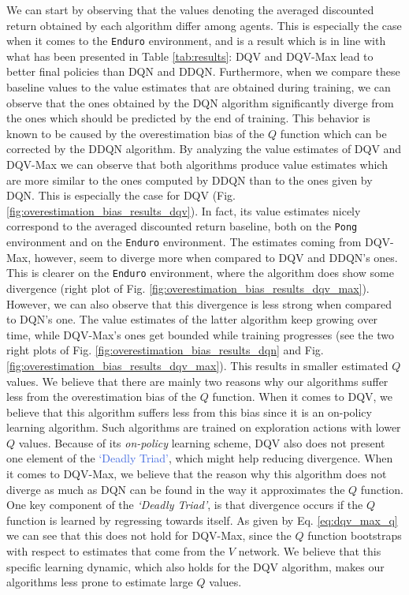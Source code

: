We can start by observing that the values denoting the averaged discounted return obtained by each algorithm differ among agents. This is especially the case when it comes to the \texttt{Enduro} environment, and is a result which is in line with what has been presented in Table \ref{tab:results}: DQV and DQV-Max lead to better final policies than DQN and DDQN. Furthermore, when we compare these baseline values to the value estimates that are obtained during training, we can observe that the ones obtained by the DQN algorithm significantly diverge from the ones which should be predicted by the end of training. This behavior is known to be caused by the overestimation bias of the $Q$ function which can be corrected by the DDQN algorithm. By analyzing the value estimates of DQV and DQV-Max we can observe that both algorithms produce value estimates which are more similar to the ones computed by DDQN than to the ones given by DQN. This is especially the case for DQV (Fig. \ref{fig:overestimation_bias_results_dqv}). In fact, its value estimates nicely correspond to the averaged discounted return baseline, both on the \texttt{Pong} environment and on the \texttt{Enduro} environment. The estimates coming from DQV-Max, however, seem to diverge more when compared to DQV and DDQN's ones. This is clearer on the \texttt{Enduro} environment, where the algorithm does show some divergence (right plot of Fig. \ref{fig:overestimation_bias_results_dqv_max}). However, we can also observe that this divergence is less strong when compared to DQN's one. The value estimates of the latter algorithm keep growing over time, while DQV-Max's ones get bounded while training progresses (see the two right plots of Fig. \ref{fig:overestimation_bias_results_dqn} and Fig. \ref{fig:overestimation_bias_results_dqv_max}). This results in smaller estimated $Q$ values. We believe that there are mainly two reasons why our algorithms suffer less from the overestimation bias of the $Q$ function. When it comes to DQV, we believe that this algorithm suffers less from this bias since it is an on-policy learning algorithm. Such algorithms are trained on exploration actions with lower $Q$ values. Because of its \textit{on-policy} learning scheme, DQV also does not present one element of the \textcolor{RoyalBlue}{`Deadly Triad'}, which might help reducing divergence. When it comes to DQV-Max, we believe that the reason why this algorithm does not diverge as much as DQN can be found in the way it approximates the $Q$ function. One key component of the \textit{`Deadly Triad'}, is that divergence occurs if the $Q$ function is learned by regressing towards itself. As given by Eq. \ref{eq:dqv_max_q} we can see that this does not hold for DQV-Max, since the $Q$ function bootstraps with respect to estimates that come from the $V$ network. We believe that this specific learning dynamic, which also holds for the DQV algorithm, makes our algorithms less prone to estimate large $Q$ values.

